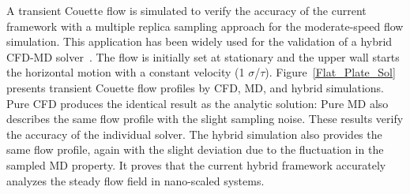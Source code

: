 \documentclass[preprint,12pt]{elsarticle}
\begin{document}

A transient Couette flow is simulated to verify the accuracy of the current framework with a multiple replica sampling approach for the moderate-speed flow simulation. This application has been widely used for the validation of a hybrid CFD-MD solver~\cite{Nie,Yen}. The flow is initially set at stationary and the upper wall starts the horizontal motion with a constant velocity (1 $\sigma$/$\tau$). Figure~\ref{Flat_Plate_Sol} presents transient Couette flow profiles by CFD, MD, and hybrid simulations. Pure CFD produces the identical result as the analytic solution: Pure MD also describes the same flow profile with the slight sampling noise. These results verify the accuracy of the individual solver. The hybrid simulation also provides the same flow profile, again with the slight deviation due to the fluctuation in the sampled MD property. It proves that the current hybrid framework accurately analyzes the steady flow field in nano-scaled systems.
\end{document}
